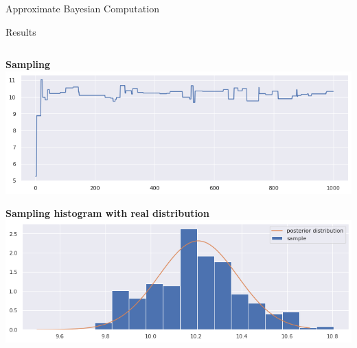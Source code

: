 \documentclass{beamer}
\begin{document}
\begin{section}{Approximate Bayesian Computation}
\begin{frame}{Results}
\begin{columns}
\begin{column}{0.5\textwidth}


\begin{minipage}{0.99\textwidth}
\begin{center}
	{\scriptsize \textbf{Sampling}}
	\includegraphics[width=\textwidth]{ABC_graphs/ABCiter1000}
\end{center}
\end{minipage}

\vspace{0.2cm}

\begin{minipage}{0.99\textwidth}
\begin{center}
	{\scriptsize \textbf{Sampling histogram with real distribution}}
	\includegraphics[width=\textwidth]{ABC_graphs/ABCunivgraphic}
\end{center}
\end{minipage}


\end{column}
\end{columns}

\end{frame}



\end{section}
\end{document}
